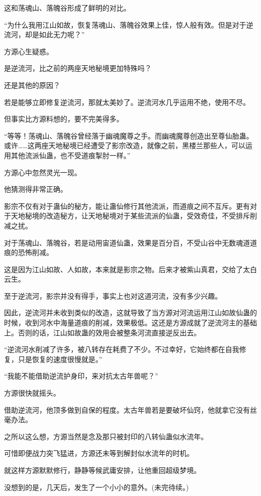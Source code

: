 \begin{this_body}
这和荡魂山、落魄谷形成了鲜明的对比。

“为什么我用江山如故，恢复荡魂山、落魄谷效果上佳，惊人般有效。但是对于逆流河，却是如此无力呢？”

方源心生疑惑。

是逆流河，比之前的两座天地秘境更加特殊吗？

还是其他的原因？

若是能够立即修复逆流河，那就太美妙了。逆流河水几乎运用不绝，使用不尽。

但事实比方源料想的，要不完美得多。

“等等！荡魂山、落魄谷曾经落于幽魂魔尊之手。而幽魂魔尊创造出至尊仙胎蛊。或许……这两座天地秘境已经遭受了影宗改造，就像之前，黑楼兰那些人，可以运用其他流派仙蛊，也不受道痕掣肘一样。”

方源心中忽然灵光一现。

他猜测得非常正确。

影宗不仅有对于蛊仙的秘方，能让蛊仙修行其他流派，而道痕之间不互斥。更有对于天地秘境的改造秘方，让天地秘境对于某些流派的仙蛊，受效奇佳，不受排斥削减之扰。

对于荡魂山、落魄谷，若是动用宙道仙蛊，效果是百分百，不受山谷中无数魂道道痕的恐怖削减。

这是因为江山如故、人如故，本来就是影宗之物。后来才被紫山真君，交给了太白云生。

至于逆流河，影宗并没有得手，事实上也对这道河流，没有多少兴趣。

因此，逆流河并未收到类似的改造，这就导致了当方源对河流运用江山如故仙蛊的时候，收到河水中海量道痕的削减，效果极低。这还是方源成就了逆流河主的基础上。否则的话，江山如故蛊的效用会被整条河流直接逆反出去。

“逆流河水削减了许多，被八转存在耗费了不少。不过幸好，它始终都在自我修复，只是恢复的速度很慢就是。”

“我能不能借助逆流护身印，来对抗太古年兽呢？”

方源很快就摇头。

借助逆流河，他顶多做到自保的程度。太古年兽若是要破坏仙窍，他就拿它没有丝毫办法。

之所以这么想，方源当然是念及那只被封印的八转仙蛊似水流年。

可惜即便战力突飞猛进，方源还未等到解封似水流年的时机。

就这样方源默默修行，静静等候武庸安排，让他重回超级梦境。

没想到的是，几天后，发生了一个小小的意外。(未完待续。)

\end{this_body}

